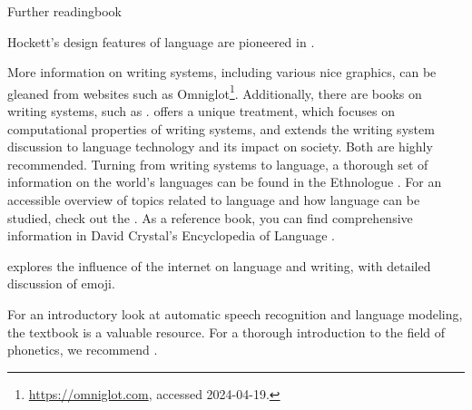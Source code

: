 
\begin{tblsfilledsymbol}{Further reading}{book}


Hockett's design features of language are pioneered in \citet{Hockett:1960}.

More information on writing systems, including various nice graphics,
can be gleaned from websites such as Omniglot\footnote{\url{https://omniglot.com}, accessed 2024-04-19.}.
Additionally, there are books on writing systems, such as
\citet{daniels:bright:96}.  \citet{sproat:00} offers a unique
treatment, which focuses on computational properties of writing
systems, and \citet{Sproat-11} extends the writing system discussion
to language technology and its impact on society. Both are highly
recommended.  Turning from writing systems to language, a thorough set
of information on the world's languages can be found in the Ethnologue
\citep{gordon:05}. For an accessible overview of topics related to
language and how language can be studied, check out the 
\citep{LanguageFiles13}. As a reference book, you can find
comprehensive information in David Crystal's Encyclopedia of Language
\citep{Crystal-11}.

\citet{McCulloch:2020} explores the influence of the internet on language and writing, with detailed discussion of emoji.

For an introductory look at automatic speech recognition and language
modeling, the \citet{Jurafsky.Martin-09} textbook is a valuable
resource. 
For a thorough
introduction to the field of phonetics, we recommend \citet{LadefogedJohnson:2014}. 

\end{tblsfilledsymbol}
